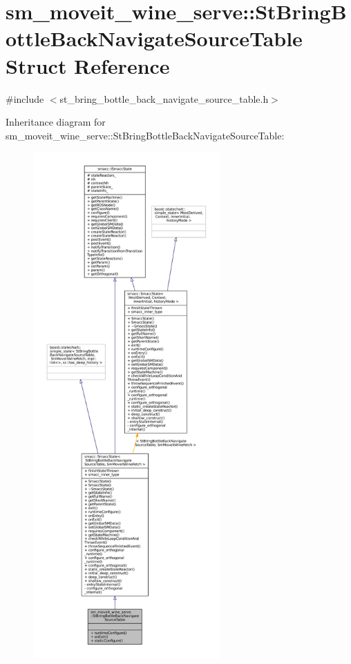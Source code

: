 \hypertarget{structsm__moveit__wine__serve_1_1StBringBottleBackNavigateSourceTable}{}\section{sm\+\_\+moveit\+\_\+wine\+\_\+serve\+:\+:St\+Bring\+Bottle\+Back\+Navigate\+Source\+Table Struct Reference}
\label{structsm__moveit__wine__serve_1_1StBringBottleBackNavigateSourceTable}


{\ttfamily \#include $<$st\+\_\+bring\+\_\+bottle\+\_\+back\+\_\+navigate\+\_\+source\+\_\+table.\+h$>$}



Inheritance diagram for sm\+\_\+moveit\+\_\+wine\+\_\+serve\+:\+:St\+Bring\+Bottle\+Back\+Navigate\+Source\+Table\+:
\nopagebreak
\begin{figure}[H]
\begin{center}
\leavevmode
\includegraphics[height=550pt]{structsm__moveit__wine__serve_1_1StBringBottleBackNavigateSourceTable__inherit__graph}
\end{center}
\end{figure}


